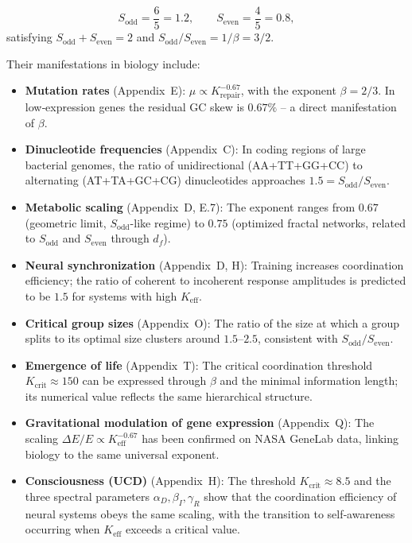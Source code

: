 \documentclass[12pt,a4paper]{article}
\theoremstyle{remark}
\begin{document}
	\[
	S_{\mathrm{odd}} = \frac{6}{5}=1.2,\qquad S_{\mathrm{even}} = \frac{4}{5}=0.8,
	\]
	satisfying \(S_{\mathrm{odd}}+S_{\mathrm{even}}=2\) and \(S_{\mathrm{odd}}/S_{\mathrm{even}} = 1/\beta = 3/2\).
	
	Their manifestations in biology include:
	
	\begin{itemize}
		\item \textbf{Mutation rates} (Appendix~E): \(\mu \propto K_{\mathrm{repair}}^{-0.67}\), with the exponent \(\beta = 2/3\). In low‑expression genes the residual GC skew is \(0.67\%\) – a direct manifestation of \(\beta\).
		\item \textbf{Dinucleotide frequencies} (Appendix~C): In coding regions of large bacterial genomes, the ratio of unidirectional (AA+TT+GG+CC) to alternating (AT+TA+GC+CG) dinucleotides approaches \(1.5 = S_{\mathrm{odd}}/S_{\mathrm{even}}\).
		\item \textbf{Metabolic scaling} (Appendix~D, E.7): The exponent ranges from \(0.67\) (geometric limit, \(S_{\mathrm{odd}}\)-like regime) to \(0.75\) (optimized fractal networks, related to \(S_{\mathrm{odd}}\) and \(S_{\mathrm{even}}\) through \(d_f\)).
		\item \textbf{Neural synchronization} (Appendix~D, H): Training increases coordination efficiency; the ratio of coherent to incoherent response amplitudes is predicted to be \(1.5\) for systems with high \(K_{\mathrm{eff}}\).
		\item \textbf{Critical group sizes} (Appendix~O): The ratio of the size at which a group splits to its optimal size clusters around \(1.5\)–\(2.5\), consistent with \(S_{\mathrm{odd}}/S_{\mathrm{even}}\).
		\item \textbf{Emergence of life} (Appendix~T): The critical coordination threshold \(K_{\mathrm{crit}} \approx 150\) can be expressed through \(\beta\) and the minimal information length; its numerical value reflects the same hierarchical structure.
		\item \textbf{Gravitational modulation of gene expression} (Appendix~Q): The scaling \(\Delta E/E \propto K_{\mathrm{eff}}^{-0.67}\) has been confirmed on NASA GeneLab data, linking biology to the same universal exponent.
		\item \textbf{Consciousness (UCD)} (Appendix~H): The threshold \(K_{\mathrm{crit}} \approx 8.5\) and the three spectral parameters \(\alpha_D,\beta_I,\gamma_R\) show that the coordination efficiency of neural systems obeys the same scaling, with the transition to self‑awareness occurring when \(K_{\mathrm{eff}}\) exceeds a critical value.
	\end{itemize}
	
\end{document}
